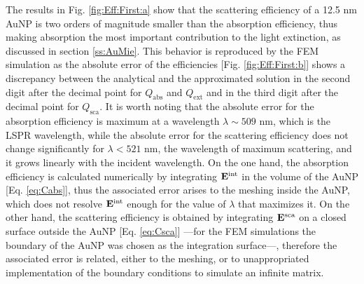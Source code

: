 The results in Fig. \ref{fig:Eff:First:a} show that the scattering efficiency of a 12.5 nm AuNP is two orders of magnitude smaller than the absorption efficiency, thus making absorption the most important contribution to the light extinction, as discussed in section \ref{ss:AuMie}. This behavior is reproduced by the FEM simulation as the absolute error of the efficiencies [Fig. \ref{fig:Eff:First:b}] shows a discrepancy between the analytical and the approximated solution in the second digit after the decimal point for $Q_\text{abs}$ and $Q_\text{ext}$ and in the third digit after the decimal point for $Q_\text{sca}$. It is worth noting that the absolute error for the absorption efficiency is maximum at a wavelength $\lambda\sim 509$ nm, which is the LSPR wavelength, while the absolute error for the scattering efficiency does not change significantly for $\lambda < 521$ nm, the wavelength of maximum scattering, and it grows linearly with the incident wavelength. On the one hand, the absorption efficiency is calculated numerically by integrating $\vb{E}^\text{int}$ in the volume of the AuNP [Eq. \eqref{eq:Cabs}], thus the associated error arises to the meshing inside the AuNP, which does not resolve $\vb{E}^\text{int}$ enough for the value of $\lambda$ that maximizes it. On the other hand, the scattering efficiency is obtained by integrating $\vb{E}^\text{sca}$ on a closed surface outside the AuNP [Eq. \eqref{eq:Csca}] ---for the FEM simulations the boundary of the AuNP was chosen as the integration surface---, therefore the associated error is related, either to the meshing, or to unappropriated implementation of the boundary conditions to simulate an infinite matrix.

